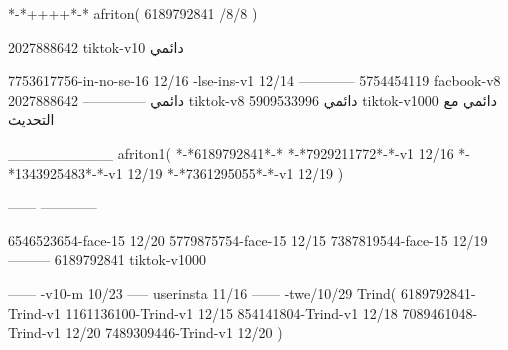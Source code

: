 *-*++++*-*
afriton(
6189792841 /8/8
)

2027888642 tiktok-v10
دائمي

7753617756-in-no-se-16 12/16
-lse-ins-v1 12/14
------------
5754454119 facbook-v8
دائمي
--------------
2027888642 tiktok-v8
دائمي
5909533996 tiktok-v1000
دائمي مع التحديث

__________
afriton1(
*-*6189792841*-*
*-*7929211772*-*-v1 12/16
*-*1343925483*-*-v1 12/19
*-*7361295055*-*-v1 12/19
)

------
------------


6546523654-face-15 12/20
5779875754-face-15 12/15
7387819544-face-15 12/19
---------
6189792841 tiktok-v1000
 
------
-v10-m 10/23
-----
userinsta 11/16
------
-twe/10/29
Trind(
6189792841-Trind-v1 
1161136100-Trind-v1 12/15
854141804-Trind-v1 12/18
7089461048-Trind-v1 12/20
7489309446-Trind-v1 12/20
)
